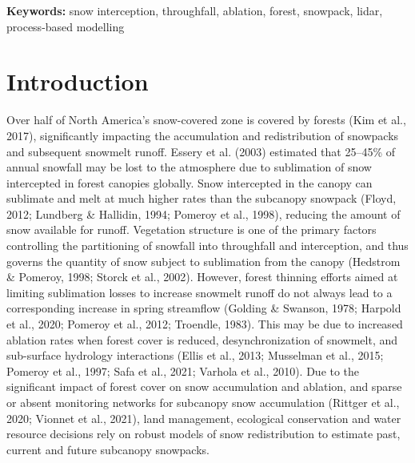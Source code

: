 \documentclass[
  letterpaper,
  DIV=11,
  numbers=noendperiod]{scrartcl}
\begin{document}
\textbf{Keywords:} snow interception, throughfall, ablation, forest,
snowpack, lidar, process-based modelling

\section{Introduction}\label{introduction}

Over half of North America's snow-covered zone is covered by forests
(Kim et al., 2017), significantly impacting the accumulation and
redistribution of snowpacks and subsequent snowmelt runoff. Essery et
al. (2003) estimated that 25--45\% of annual snowfall may be lost to the
atmosphere due to sublimation of snow intercepted in forest canopies
globally. Snow intercepted in the canopy can sublimate and melt at much
higher rates than the subcanopy snowpack (Floyd, 2012; Lundberg \&
Hallidin, 1994; Pomeroy et al., 1998), reducing the amount of snow
available for runoff. Vegetation structure is one of the primary factors
controlling the partitioning of snowfall into throughfall and
interception, and thus governs the quantity of snow subject to
sublimation from the canopy (Hedstrom \& Pomeroy, 1998; Storck et al.,
2002). However, forest thinning efforts aimed at limiting sublimation
losses to increase snowmelt runoff do not always lead to a corresponding
increase in spring streamflow (Golding \& Swanson, 1978; Harpold et al.,
2020; Pomeroy et al., 2012; Troendle, 1983). This may be due to
increased ablation rates when forest cover is reduced, desynchronization
of snowmelt, and sub-surface hydrology interactions (Ellis et al., 2013;
Musselman et al., 2015; Pomeroy et al., 1997; Safa et al., 2021; Varhola
et al., 2010). Due to the significant impact of forest cover on snow
accumulation and ablation, and sparse or absent monitoring networks for
subcanopy snow accumulation (Rittger et al., 2020; Vionnet et al.,
2021), land management, ecological conservation and water resource
decisions rely on robust models of snow redistribution to estimate past,
current and future subcanopy snowpacks.
\end{document}
